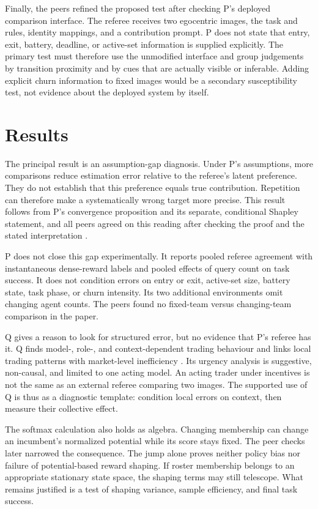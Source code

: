 \documentclass{article}
\begin{document}
Finally, the peers refined the proposed test after checking P's deployed comparison interface.  The referee receives two egocentric images, the task and rules, identity mappings, and a contribution prompt.  P does not state that entry, exit, battery, deadline, or active-set information is supplied explicitly.  The primary test must therefore use the unmodified interface and group judgements by transition proximity and by cues that are actually visible or inferable.  Adding explicit churn information to fixed images would be a secondary susceptibility test, not evidence about the deployed system by itself.

\section{Results}

The principal result is an assumption-gap diagnosis.  Under P's assumptions, more comparisons reduce estimation error relative to the referee's latent preference.  They do not establish that this preference equals true contribution.  Repetition can therefore make a systematically wrong target more precise.  This result follows from P's convergence proposition and its separate, conditional Shapley statement, and all peers agreed on this reading after checking the proof and the stated interpretation \cite{P}.

P does not close this gap experimentally.  It reports pooled referee agreement with instantaneous dense-reward labels and pooled effects of query count on task success.  It does not condition errors on entry or exit, active-set size, battery state, task phase, or churn intensity.  Its two additional environments omit changing agent counts.  The peers found no fixed-team versus changing-team comparison in the paper.

Q gives a reason to look for structured error, but no evidence that P's referee has it.  Q finds model-, role-, and context-dependent trading behaviour and links local trading patterns with market-level inefficiency \cite{Q}.  Its urgency analysis is suggestive, non-causal, and limited to one acting model.  An acting trader under incentives is not the same as an external referee comparing two images.  The supported use of Q is thus as a diagnostic template: condition local errors on context, then measure their collective effect.

The softmax calculation also holds as algebra.  Changing membership can change an incumbent's normalized potential while its score stays fixed.  The peer checks later narrowed the consequence.  The jump alone proves neither policy bias nor failure of potential-based reward shaping.  If roster membership belongs to an appropriate stationary state space, the shaping terms may still telescope.  What remains justified is a test of shaping variance, sample efficiency, and final task success.
\end{document}
